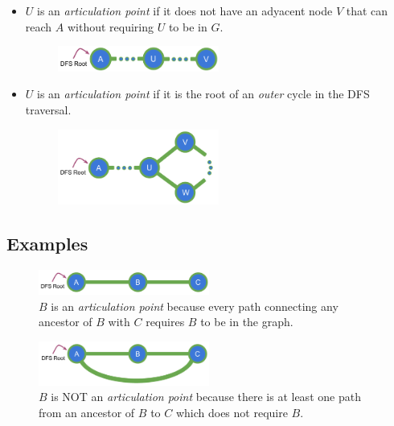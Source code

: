 \documentclass[twoside, openany]{book}
\begin{document}
\begin{itemize}
  \item[\bullet] $U$ is an \textit{articulation point} if it does not have an adyacent node $V$ that can reach $A$ without
        requiring $U$ to be in $G$.
        \begin{figure}[H]
          \centering
          \includegraphics[width=0.5\textwidth]{"Images/Graph Theory/Articulation Points And Bridges/g9.pdf"}
          \caption{}
          \label{fig:apb_g9}
        \end{figure}
        \newpage
  \item[\bullet] $U$ is an \textit{articulation point} if it is the root of an \textit{outer} cycle in the DFS traversal.
        \begin{figure}[H]
          \centering
          \includegraphics[width=0.5\textwidth]{"Images/Graph Theory/Articulation Points And Bridges/g8.pdf"}
          \caption{}
          \label{fig:apb_g8}
        \end{figure}
\end{itemize}

\subsection*{Examples}

\begin{figure}[H]
  \centering
  \includegraphics[width=0.5\textwidth]{"Images/Graph Theory/Articulation Points And Bridges/g5.pdf"}
  \caption{$B$ is an \textit{articulation point} because every path connecting any ancestor of $B$ with $C$
    requires $B$ to be in the graph.}
  \label{fig:apb_g5}
\end{figure}

\begin{figure}[H]
  \centering
  \includegraphics[width=0.5\textwidth]{"Images/Graph Theory/Articulation Points And Bridges/g4.pdf"}
  \caption{$B$ is NOT an \textit{articulation point} because there is at least one path from an ancestor of $B$ to $C$
    which does not require $B$.}
  \label{fig:apb_g4}
\end{figure}
\end{document}

